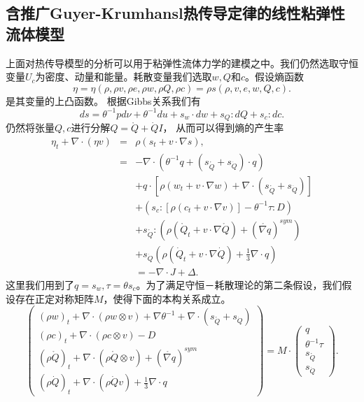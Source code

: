 \subsection{含推广Guyer-Krumhansl热传导定律的线性粘弹性流体模型}
上面对热传导模型的分析可以用于粘弹性流体力学的建模之中。我们仍然选取守恒变量$U_c$为密度、动量和能量。耗散变量我们选取$w,Q$和$c$。假设熵函数
\begin{equation*}
	\eta = \eta (\rho,\rho v,\rho e,\rho w,\rho Q,\rho c) = \rho s(\rho,v,e,w,Q,c).
\end{equation*}
是其变量的上凸函数。
根据Gibbs关系我们有
\begin{equation*}
			ds = \theta^{-1} pd\nu + \theta^{-1} du + s_w \cdot dw + s_Q : d Q+ s_c : dc.
\end{equation*}
仍然将张量$Q,c$进行分解$Q = \mathring{Q} +\dot{Q}I$，
从而可以得到熵的产生率
\begin{eqnarray*}
		\eta_t + \nabla \cdot (\eta v) &=& \rho (s_t + v \cdot \nabla s), \\
		&=& -\nabla \cdot (\theta^{-1} q + (s_{\mathring{{Q}}}+s_{\dot{Q}}) \cdot {q} )  \\
		&&+ q \cdot [\rho (w_t + v \cdot \nabla w) + \nabla \cdot (s_{\mathring{{Q}}}+s_{\dot{Q}})] \\
		&&+ (s_c:[\rho (c_t + v \cdot \nabla v)] - \theta^{-1} \tau : D) \\
		&&+s_{\mathring{{Q}}}:(\rho (\mathring{{Q}}_t + v \cdot \nabla \mathring{Q})+(\mathring{\nabla {q}})^{sym}) \\
		&&+s_{\dot{Q}}(\rho (\dot{Q}_t + v \cdot \nabla \dot{Q})+\frac{1}{3}\nabla \cdot {q}) \\
		&& = -\nabla \cdot J + \Delta. 
\end{eqnarray*}
这里我们用到了$q=s_w,\tau = \theta s_c$。为了满足守恒－耗散理论的第二条假设，我们假设存在正定对称矩阵$M$，使得下面的本构关系成立。
\begin{equation*}
   	\left( \begin{array}{c} 
			(\rho w)_t +  \nabla \cdot (\rho w \otimes v)  + \nabla \theta^{-1} + \nabla \cdot (s_{\mathring{{Q}}}+s_{\dot{Q}})\\
			(\rho c)_t +  \nabla \cdot (\rho c \otimes v)  - D \\
			(\rho \mathring{{Q}})_t + \nabla \cdot (\rho \mathring{Q} \otimes v)+(\mathring{\nabla {q}})^{sym} \\ (\rho \dot{Q})_t + \nabla \cdot (\rho \dot{Q} v)+\frac{1}{3} \nabla \cdot {q}
		\end{array} \right) = M \cdot
		\left( \begin{array}{c} 
			q \\ \theta^{-1} \tau \\s_{\mathring{{Q}}} \\s_{\dot{Q}}
		\end{array}\right).
\end{equation*} 
